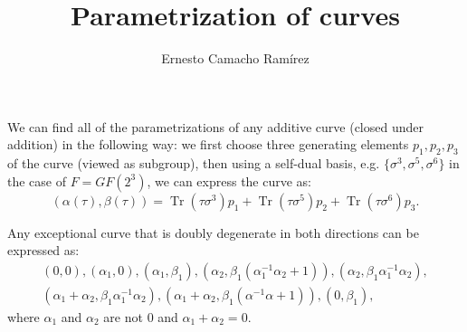 \documentclass[a4paper]{article}
\title{Parametrization of curves}
\author{Ernesto Camacho Ramírez}
\DeclareMathOperator{\Tr}{Tr}
\begin{document}
  \maketitle

  We can find all of the parametrizations of any additive
  curve (closed under addition) in the following way: we
  first choose three generating elements $p_1,p_2,p_3$ of
  the curve (viewed as subgroup), then using a self-dual
  basis, e.g.  $\{\sigma^3,\sigma^5,\sigma^6\}$ in the case
  of $F = GF(2^3)$, we can express the curve as:
  \begin{equation}
    \label{eqn:param}
    (\alpha(\tau), \beta(\tau))
    = \Tr(\tau \sigma^3) p_1 + \Tr(\tau \sigma^{5}) p_2 +
    \Tr(\tau \sigma^{6}) p_3.
  \end{equation}

  Any exceptional curve that is doubly degenerate in both
  directions can be expressed as:
  \begin{align*}
    (0,0), (\alpha_1,0), (\alpha_1,\beta_1),
    (\alpha_2,\beta_1(\alpha_1^{-1}\alpha_2+1)),
    (\alpha_2,\beta_1\alpha_1^{-1}\alpha_2),\\
    (\alpha_1+\alpha_2,\beta_1\alpha_1^{-1}\alpha_2),
    (\alpha_1+\alpha_2,\beta_1(\alpha^{-1}\alpha +
    1)),(0,\beta_1),
  \end{align*}
  where $\alpha_1$ and $\alpha_2$ are not $0$ and $\alpha_1
  + \alpha_2 = 0$.
\end{document}
